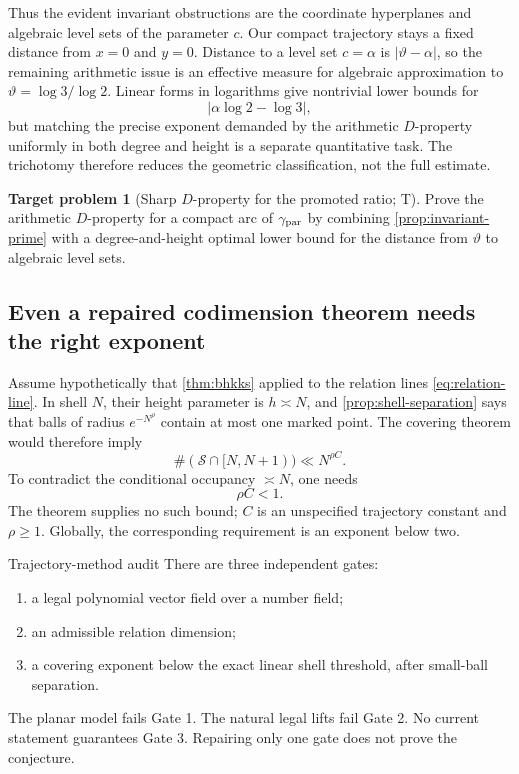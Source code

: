 \documentclass[10pt,oneside]{article}
\theoremstyle{definition}
\newtheorem{problem}[theorem]{Target problem}
\theoremstyle{remark}
\newcommand{\Sol}{\mathcal S}
\newcommand{\thetaq}{\vartheta}
\newcommand{\statusT}{\textsc{T}}
\begin{document}
Thus the evident invariant obstructions are the coordinate hyperplanes and algebraic level sets of the parameter \(c\).  Our compact trajectory stays a fixed distance from \(x=0\) and \(y=0\).  Distance to a level set \(c=\alpha\) is \(|\thetaq-\alpha|\), so the remaining arithmetic issue is an effective measure for algebraic approximation to
\(
 \thetaq=\log3/\log2
\).
Linear forms in logarithms give nontrivial lower bounds for
\[
 |\alpha\log2-\log3|,
\]
but matching the precise exponent demanded by the arithmetic \(D\)-property uniformly in both degree and height is a separate quantitative task.  The trichotomy therefore reduces the geometric classification, not the full estimate.

\begin{problem}[Sharp \(D\)-property for the promoted ratio; \statusT]
\label{prob:d-property-theta}
Prove the arithmetic \(D\)-property for a compact arc of \(\gamma_{\rm par}\) by combining \cref{prop:invariant-prime} with a degree-and-height optimal lower bound for the distance from \(\thetaq\) to algebraic level sets.
\end{problem}

\subsection{Even a repaired codimension theorem needs the right exponent}
Assume hypothetically that \cref{thm:bhkks} applied to the relation lines \eqref{eq:relation-line}.  In shell \(N\), their height parameter is \(h\asymp N\), and \cref{prop:shell-separation} says that balls of radius \(e^{-N^\rho}\) contain at most one marked point.  The covering theorem would therefore imply
\[
 \#(\Sol\cap[N,N+1))\ll N^{\rho C}.
\]
To contradict the conditional occupancy \(\asymp N\), one needs
\[
 \rho C<1.
\]
The theorem supplies no such bound; \(C\) is an unspecified trajectory constant and \(\rho\ge1\).  Globally, the corresponding requirement is an exponent below two.

\begin{statusbox}{Trajectory-method audit}
There are three independent gates:
\begin{enumerate}
\item a legal polynomial vector field over a number field;
\item an admissible relation dimension;
\item a covering exponent below the exact linear shell threshold, after small-ball separation.
\end{enumerate}
The planar model fails Gate 1.  The natural legal lifts fail Gate 2.  No current statement guarantees Gate 3.  Repairing only one gate does not prove the conjecture.
\end{statusbox}
\end{document}
